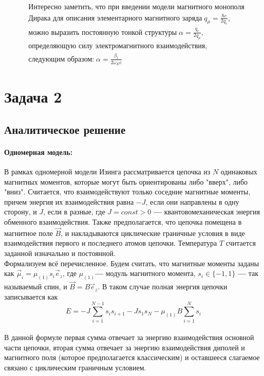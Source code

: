 \documentclass[oneside,final,14pt]{extarticle}
\begin{document}
	\vskip16pt
	\[
	\boxed{
		\begin{aligned}
			& \text{Интересно заметить, что при введении модели магнитного монополя} \\
			& \text{Дирака для описания элементарного магнитного заряда}\; q_{\mu} = \frac{\hbar c}{2q_{e}}, \\
			& \text{можно выразить постоянную тонкой структуры}\; \alpha = \frac{q_{e}}{2q_{\mu}}, \\
			& \text{определяющую силу электромагнитного взаимодействия,} \\
			& \text{следующим образом:}\; \alpha = \frac{\beta_{1}}{2 \omega_{E}c}
		\end{aligned}
	}
	\]
	\clearpage
	\section{Задача 2}
	\subsection{Аналитическое решение}
	\paragraph{Одномерная модель:}
	В рамках одномерной модели Изинга рассматривается цепочка из $N$ одинаковых магнитных моментов, которые могут быть ориентированы либо "вверх", либо "вниз". Считается, что взаимодействуют только соседние магнитные моменты, причем энергия их взаимодействия равна $-J$, если они направлены в одну сторону, и $J$, если в разные, где $J=const>0$ \textbf{---} квантовомеханическая энергия обменного взаимодействия. Также предполагается, что цепочка помещена в магнитное поле $\vec B$, и накладываются циклические граничные условия в виде взаимодействия первого и последнего атомов цепочки. Температура $T$ считается заданной изначально и постоянной. \\
	
	\noindent Формализуем всё перечисленное. Будем считать, что магнитные моменты заданы как $\vec \mu_{i}=\mu_{(1)}s_{i}\vec e_{z}$, где $\mu_{(1)}$\textbf{---} модуль магнитного момента, $s_{i} \in \{-1, 1\}$ \textbf{---} так называемый спин, и $\vec B=B\vec e_{z}$. В таком случае полная энергия цепочки записывается как 
	$$E=-J\sum_{i=1}^{N-1}s_{i}s_{i+1}-Js_{1}s_{N}-\mu_{(1)}B\sum_{i=1}^{N}s_{i}$$ \\
	
	\noindent В данной формуле первая сумма отвечает за энергию взаимодействия основной части цепочки, вторая сумма отвечает за энергию взаимодействия диполей и магнитного поля (которое предполагается классическим) и оставшееся слагаемое связано с циклическим граничным условием. \\
	
\end{document}
